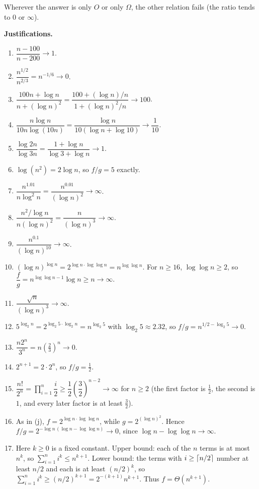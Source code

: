 \documentclass[11pt]{article}
\DeclarePairedDelimiter{\ceil}{\lceil}{\rceil}
\theoremstyle{definition}
\begin{document}
Wherever the answer is only $O$ or only $\Omega$, the other relation fails (the ratio tends to $0$ or $\infty$).

\textbf{Justifications.}
\begin{enumerate}[label=(\alph*), leftmargin=2.2em, itemsep=0.25em]
\item $\dfrac{n-100}{n-200}\to 1$.
\item $\dfrac{n^{1/2}}{n^{2/3}}=n^{-1/6}\to 0$.
\item $\dfrac{100n+\log n}{n+(\log n)^2}=\dfrac{100+(\log n)/n}{1+(\log n)^2/n}\to 100$.
\item $\dfrac{n\log n}{10n\log(10n)}=\dfrac{\log n}{10(\log n+\log 10)}\to\dfrac1{10}$.
\item $\dfrac{\log 2n}{\log 3n}=\dfrac{1+\log n}{\log 3+\log n}\to 1$.
\item $\log(n^2)=2\log n$, so $f/g=5$ exactly.
\item $\dfrac{n^{1.01}}{n\log^2 n}=\dfrac{n^{0.01}}{(\log n)^2}\to\infty$.
\item $\dfrac{n^2/\log n}{n(\log n)^2}=\dfrac{n}{(\log n)^3}\to\infty$.
\item $\dfrac{n^{0.1}}{(\log n)^{10}}\to\infty$.
\item $(\log n)^{\log n}=2^{\log n\cdot\log\log n}=n^{\log\log n}$. For $n\ge 16$, $\log\log n\ge 2$, so
  $\dfrac{f}{g}=n^{\log\log n-1}\log n\ge n\to\infty$.
\item $\dfrac{\sqrt n}{(\log n)^3}\to\infty$.
\item $5^{\log_2 n}=2^{\log_2 5\cdot\log_2 n}=n^{\log_2 5}$ with $\log_2 5\approx 2.32$, so
  $f/g=n^{1/2-\log_2 5}\to 0$.
\item $\dfrac{n2^n}{3^n}=n\left(\tfrac23\right)^n\to 0$.
\item $2^{n+1}=2\cdot 2^n$, so $f/g=\tfrac12$.
\item $\dfrac{n!}{2^n}=\prod_{i=1}^n\dfrac i2\ge\dfrac12\left(\dfrac32\right)^{n-2}\to\infty$ for $n\ge2$
  (the first factor is $\tfrac12$, the second is $1$, and every later factor is at least $\tfrac32$).
\item As in (j), $f=2^{\log n\cdot\log\log n}$, while $g=2^{(\log n)^2}$. Hence
  $f/g=2^{-\log n\,(\log n-\log\log n)}\to 0$, since $\log n-\log\log n\to\infty$.
\item Here $k\ge 0$ is a fixed constant. Upper bound: each of the $n$ terms is at most $n^k$, so
  $\sum_{i=1}^n i^k\le n^{k+1}$. Lower bound: the terms with $i\ge\ceil{n/2}$ number at least $n/2$
  and each is at least $(n/2)^k$, so $\sum_{i=1}^n i^k\ge (n/2)^{k+1}=2^{-(k+1)}n^{k+1}$.
  Thus $f=\Theta(n^{k+1})$.
\end{enumerate}
\end{document}
